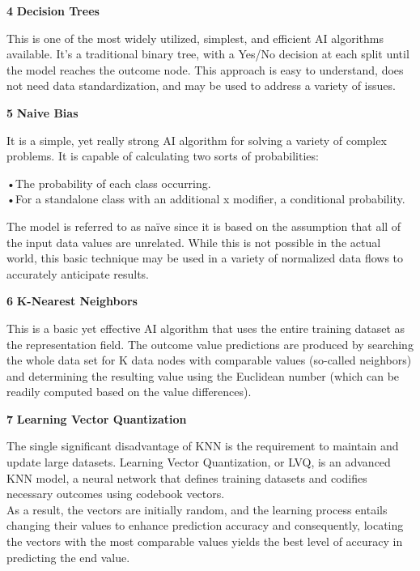 \documentclass[12pt]{article}
\begin{document}
\textbf{4} \textbf{Decision Trees}
\begin{center}
\begin{flushleft}
This is one of the most widely utilized, simplest, and efficient AI algorithms available. It's a traditional binary tree, with a Yes/No decision at each split until the model reaches the outcome node.
This approach is easy to understand, does not need data standardization, and may be used to address a variety of issues.
\end{flushleft}
\end{center}
\textbf{5} \textbf{Naive Bias}
\begin{center}
\begin{flushleft}
It is a simple, yet really strong AI algorithm for solving a variety of complex problems. It is capable of calculating two sorts of probabilities:\\
   \begin{center}
     •The probability of each class occurring.\\
     •For a standalone class with an additional x modifier, a conditional probability.\\
\end{center} 
The model is referred to as naïve since it is based on the assumption that all of the input data values are unrelated. While this is not possible in the actual world, this basic technique may be used in a variety of normalized data flows to accurately anticipate results.
\end{flushleft}
\end{center}
\textbf{6} \textbf{K-Nearest Neighbors}
\begin{center}
\begin{flushleft}
This is a basic yet effective AI algorithm that uses the entire training dataset as the representation field. The outcome value predictions are produced by searching the whole data set for K data nodes with comparable values (so-called neighbors) and determining the resulting value using the Euclidean number (which can be readily computed based on the value differences).
\end{flushleft}
\end{center}
\textbf{7} \textbf{Learning Vector Quantization}
\begin{center}
\begin{flushleft}
The single significant disadvantage of KNN is the requirement to maintain and update large datasets. Learning Vector Quantization, or LVQ, is an advanced KNN model, a neural network that defines training datasets and codifies necessary outcomes using codebook vectors. \\
As a result, the vectors are initially random, and the learning process entails changing their values to enhance prediction accuracy and consequently, locating the vectors with the most comparable values yields the best level of accuracy in predicting the end value.
\end{flushleft}
\end{center}
\end{document}
